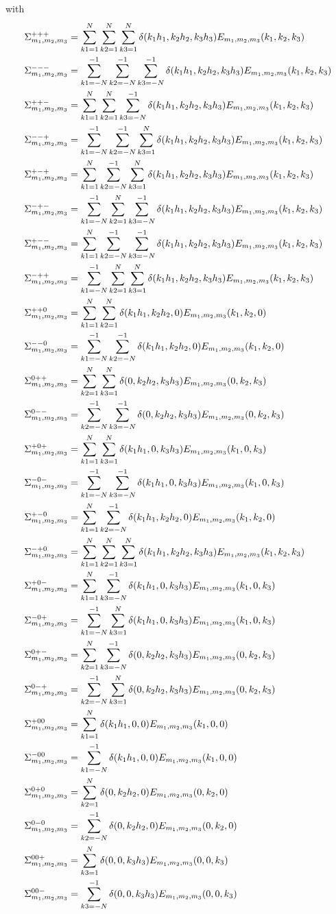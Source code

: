 with
\begin{align*}
\Sigma_{m_1,m_2,m_3}^{+++}&=\sigmaThree{ 1}{ 1}{ 1}\\
\Sigma_{m_1,m_2,m_3}^{---}&=\sigmaThree{-1}{-1}{-1}\\
\Sigma_{m_1,m_2,m_3}^{++-}&=\sigmaThree{ 1}{ 1}{-1}\\
\Sigma_{m_1,m_2,m_3}^{--+}&=\sigmaThree{-1}{-1}{ 1}\\
\Sigma_{m_1,m_2,m_3}^{+-+}&=\sigmaThree{ 1}{-1}{ 1}\\
\Sigma_{m_1,m_2,m_3}^{-+-}&=\sigmaThree{-1}{ 1}{-1}\\
\Sigma_{m_1,m_2,m_3}^{+--}&=\sigmaThree{ 1}{-1}{-1}\\
\Sigma_{m_1,m_2,m_3}^{-++}&=\sigmaThree{-1}{ 1}{ 1}\\
\Sigma_{m_1,m_2,m_3}^{++0}&=\sigmaThree{ 1}{ 1}{ 0}\\
\Sigma_{m_1,m_2,m_3}^{--0}&=\sigmaThree{-1}{-1}{ 0}\\
\Sigma_{m_1,m_2,m_3}^{0++}&=\sigmaThree{ 0}{ 1}{ 1}\\
\Sigma_{m_1,m_2,m_3}^{0--}&=\sigmaThree{ 0}{-1}{-1}\\
\Sigma_{m_1,m_2,m_3}^{+0+}&=\sigmaThree{ 1}{ 0}{ 1}\\
\Sigma_{m_1,m_2,m_3}^{-0-}&=\sigmaThree{-1}{ 0}{-1}\\
\Sigma_{m_1,m_2,m_3}^{+-0}&=\sigmaThree{ 1}{-1}{ 0}\\
\Sigma_{m_1,m_2,m_3}^{-+0}&=\sigmaThree{ 1}{ 1}{ 1}\\
\Sigma_{m_1,m_2,m_3}^{+0-}&=\sigmaThree{ 1}{ 0}{-1}\\
\Sigma_{m_1,m_2,m_3}^{-0+}&=\sigmaThree{-1}{ 0}{ 1}\\
\Sigma_{m_1,m_2,m_3}^{0+-}&=\sigmaThree{ 0}{ 1}{-1}\\
\Sigma_{m_1,m_2,m_3}^{0-+}&=\sigmaThree{ 0}{-1}{ 1}\\
\Sigma_{m_1,m_2,m_3}^{+00}&=\sigmaThree{ 1}{ 0}{ 0}\\
\Sigma_{m_1,m_2,m_3}^{-00}&=\sigmaThree{-1}{ 0}{ 0}\\
\Sigma_{m_1,m_2,m_3}^{0+0}&=\sigmaThree{ 0}{ 1}{ 0}\\
\Sigma_{m_1,m_2,m_3}^{0-0}&=\sigmaThree{ 0}{-1}{ 0}\\
\Sigma_{m_1,m_2,m_3}^{00+}&=\sigmaThree{ 0}{ 0}{ 1}\\
\Sigma_{m_1,m_2,m_3}^{00-}&=\sigmaThree{ 0}{ 0}{-1}
\end{align*}

